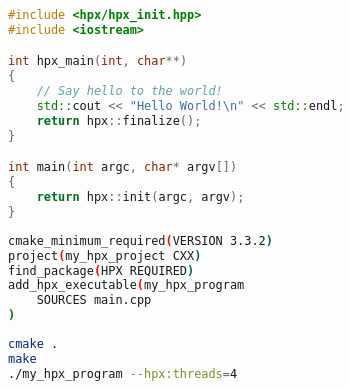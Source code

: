 \begin{lstlisting}[language=c++,caption={Initializing the HPX runtime system (II).\label{code:hpx:init}},float,floatplacement=htb]
#include <hpx/hpx_init.hpp>
#include <iostream>

int hpx_main(int, char**)
{
    // Say hello to the world!
    std::cout << "Hello World!\n" << std::endl;
    return hpx::finalize();
}

int main(int argc, char* argv[])
{
    return hpx::init(argc, argv);
}
\end{lstlisting}


\begin{minipage}{\linewidth}
\begin{minipage}{0.45\linewidth}
\begin{lstlisting}[language=bash,caption={Content of the CMakeLists.txt to build HPX applications.\label{code:cmake:hpx}},emph={project, add_executable,cmake_minimum_required},emphstyle={\color{azure}\bfseries}]
cmake_minimum_required(VERSION 3.3.2)
project(my_hpx_project CXX)
find_package(HPX REQUIRED)
add_hpx_executable(my_hpx_program
    SOURCES main.cpp
)
\end{lstlisting}
\end{minipage}
\hfill
\begin{minipage}{0.45\linewidth}
\begin{lstlisting}[language=bash,caption={Build instructions for CMake.\label{code:cmake:compile:hpx}}]
cmake .
make
./my_hpx_program --hpx:threads=4
\end{lstlisting}
\end{minipage}
\end{minipage}



